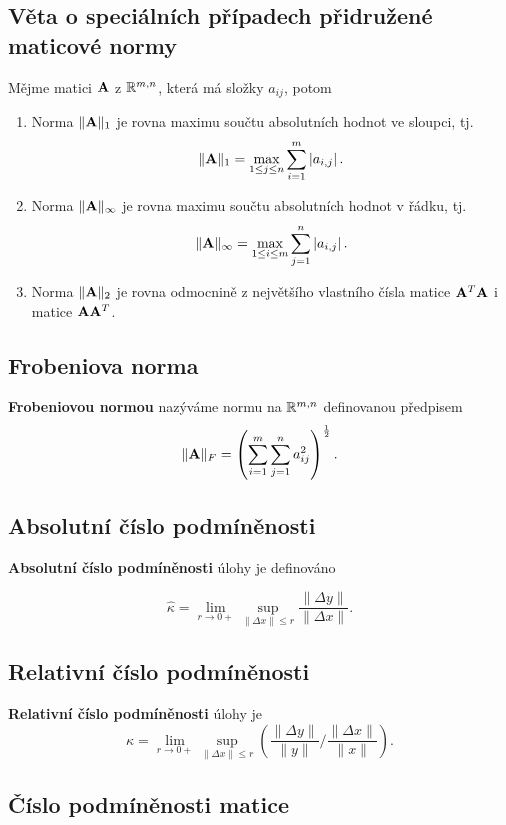 \subsection*{Věta o speciálních případech přidružené maticové normy}

Mějme matici $\mathbf{A}$ z $\mathbb{R}^{m,n}$, která má složky $a_{ij}$, potom

\begin{enumerate}
	\item Norma $\| \mathbf{A} \|_{1}$ je rovna maximu součtu absolutních hodnot ve sloupci, tj.
	\[ \| \mathbf{A} \|_{1} = \max_{1 \leq j \leq n} \sum_{i = 1}^m |a_{i,j}|\,. \]
	\item Norma $\| \mathbf{A} \|_{\infty}$ je rovna maximu součtu absolutních hodnot v řádku, tj.
	\[ \| \mathbf{A} \|_{\infty} = \max_{1 \leq i \leq m} \sum_{j = 1}^n |a_{i,j}|\,. \]
	\item Norma $\| \mathbf{A} \|_{2}$ je rovna odmocnině z největšího vlastního čísla matice $\mathbf{A}^T\mathbf{A}$ i matice $\mathbf{A}\mathbf{A}^T$.
\end{enumerate}

\subsection*{Frobeniova norma}

\textbf{Frobeniovou normou} nazýváme normu na $\mathbb{R}^{m,n}$ definovanou předpisem
\[ \| \mathbf{A} \|_{F} = \left( \sum_{i=1}^{m}  \sum_{j=1}^{n} a_{ij}^2 \right)^\frac{1}{2}. \]

\subsection*{Absolutní číslo podmíněnosti}

\textbf{Absolutní číslo podmíněnosti} úlohy je definováno

\[ \hat\kappa = \lim_{r \to 0+} \sup_{ \| \Delta x \| \leq r} \dfrac{ \| \Delta y \| }{ \| \Delta x \| }. \]

\subsection*{Relativní číslo podmíněnosti}

\textbf{Relativní číslo podmíněnosti} úlohy je
\[ \kappa = \lim_{r \to 0+} \sup_{ \| \Delta x \| \leq r}
\left({ \dfrac {\| \Delta y \| }{\|y\|}} \Big/ { \dfrac{ \|\Delta x\| }{\|x\|}}\right). \]

\subsection*{Číslo podmíněnosti matice}

